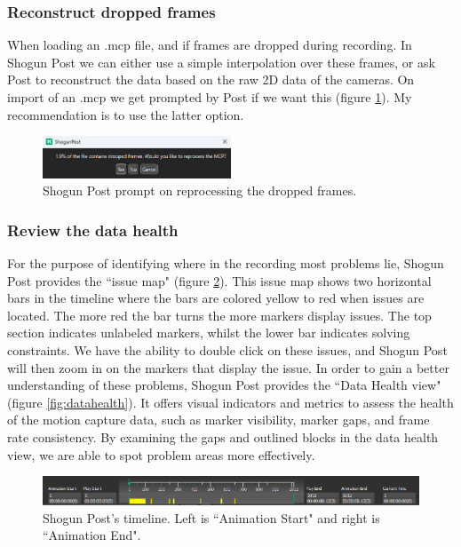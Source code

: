 \documentclass{uva-inf-article}
\begin{document}
\subsubsection{Reconstruct dropped frames}
When loading an .mcp file, and if frames are dropped during recording. In Shogun Post we can either use a simple interpolation over these frames, or ask Post to reconstruct the data based on the raw 2D data of the cameras. On import of an .mcp we get prompted by Post if we want this (figure \ref{fig:dropfix}). My recommendation is to use the latter option.
\begin{figure}[hbt!]
    \centering
    \includegraphics[width=0.5\textwidth]{imgs/DataMgtDropFix.png}
    \caption{Shogun Post prompt on reprocessing the dropped frames.}
    \label{fig:dropfix}
\end{figure}

\subsubsection{Review the data health}
For the purpose of identifying where in the recording most problems lie, Shogun Post provides the ``issue map" (figure \ref{fig:shogunPostTimeline}). This issue map shows two horizontal bars in the timeline where the bars are colored yellow to red when issues are located. The more red the bar turns the more markers display issues. The top section indicates unlabeled markers, whilst the lower bar indicates solving constraints. We have the ability to double click on these issues, and Shogun Post will then zoom in on the markers that display the issue. In order to gain a better understanding of these problems, Shogun Post provides the ``Data Health view" (figure \ref{fig:datahealth}). It offers visual indicators and metrics to assess the health of the motion capture data, such as marker visibility, marker gaps, and frame rate consistency. By examining the gaps and outlined blocks in the data health view, we are able to spot problem areas more effectively.

\begin{figure}[hbt!]
    \centering
    \includegraphics[width=1.\textwidth]{imgs/ShogunPostTimeline.png}
    \caption{Shogun Post's timeline. Left is ``Animation Start" and right is ``Animation End".}
    \label{fig:shogunPostTimeline}
\end{figure}
\end{document}
